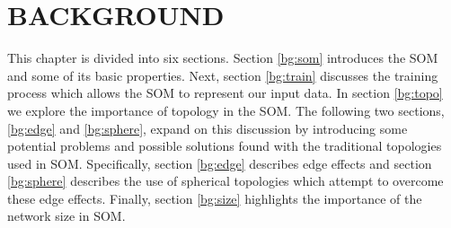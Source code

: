\chapter{BACKGROUND}
This chapter is divided into six sections.  Section \ref{bg:som} introduces
the SOM and some of its basic properties.  Next, section \ref{bg:train}
discusses the training process which allows the SOM to represent our input
data.  In section \ref{bg:topo} we explore the importance of topology in the
SOM.  The following two sections, \ref{bg:edge} and \ref{bg:sphere}, expand on
this discussion by introducing some potential problems and possible solutions
found with the traditional topologies used in SOM. Specifically, section
\ref{bg:edge} describes edge effects and section \ref{bg:sphere} describes the
use of spherical topologies which attempt to overcome these edge effects.
Finally, section \ref{bg:size} highlights the importance of the network size
in SOM.





